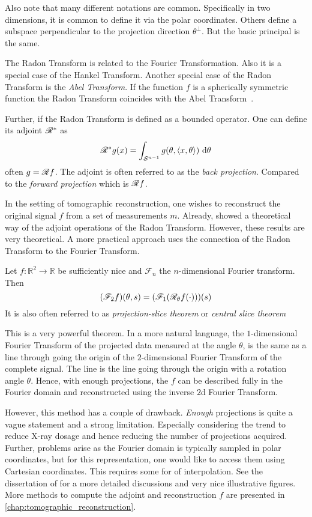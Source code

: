 Also note that many different notations are common. Specifically in two dimensions, it is common to
define it via the polar coordinates. Others define a subspace perpendicular to the projection
direction \(\theta^\perp\). But the basic principal is the same.

The Radon Transform is related to the Fourier Transformation. Also it is a special case of the
Hankel Transform. Another special case of the Radon Transform is the \textit{Abel Transform}. If the
function \(f\) is a spherically symmetric function the Radon Transform coincides with the Abel
Transform~\cite{buzug_computed_2008}.

Further, if the Radon Transform is defined as a bounded operator. One can define its adjoint
\(\mathscr{R}^\ast\) as
\[ \mathscr{R}^\ast g (x) = \int_{\mathcal{S}^{n-1}} g(\theta, \langle x, \theta \rangle) \, \, \mathrm{d} \theta \]
often \(g = \mathscr{R} f\). The adjoint is often referred to as the \textit{back projection}. Compared
to the \textit{forward projection} which is \(\mathscr{R} f\).

In the setting of tomographic reconstruction, one wishes to reconstruct the original signal \(f\)
from a set of measurements \(m\). Already, \citeauthor*{radon_uber_1917} showed a theoretical way of
the adjoint operations of the Radon Transform. However, these results are very theoretical. A more
practical approach uses the connection of the Radon Transform to the Fourier Transform.

\begin{definition}\label{def:fourier_slice_theorem}
	Let \(f\colon \mathbb{R}^2 \to \mathbb{R}\) be sufficiently nice and \(\mathscr{F}_n\) the
	\(n\)-dimensional Fourier transform. Then
	\[ (\mathscr{F}_2f)(\theta, s) = (\mathscr{F}_1(\mathscr{R}_\theta f(\cdot)))(s) \]
	It is also often referred to as \textit{projection-slice theorem} or \textit{central slice theorem}
\end{definition}

This is a very powerful theorem. In a more natural language, the \(1\)-dimensional Fourier Transform
of the projected data measured at the angle \(\theta\), is the same as a line through going the
origin of the \(2\)-dimensional Fourier Transform of the complete signal. The line is the line going
through the origin with a rotation angle \(\theta\). Hence, with enough projections, the \(f\) can be
described fully in the Fourier domain and reconstructed using the inverse \(2\)d Fourier Transform.

However, this method has a couple of drawback. \textit{Enough} projections is quite a vague
statement and a strong limitation. Especially considering the trend to reduce X-ray dosage and hence
reducing the number of projections acquired. Further, problems arise as the Fourier domain is
typically sampled in polar coordinates, but for this representation, one would like to access them
using Cartesian coordinates. This requires some for of interpolation. See the dissertation of
\citeauthor{vogel_tomographic_2015}\cite[Chapter~4.1.2]{vogel_tomographic_2015} for a more detailed
discussions and very nice illustrative figures. More methods to compute the adjoint and
reconstruction \(f\) are presented in \autoref{chap:tomographic_reconstruction}.

